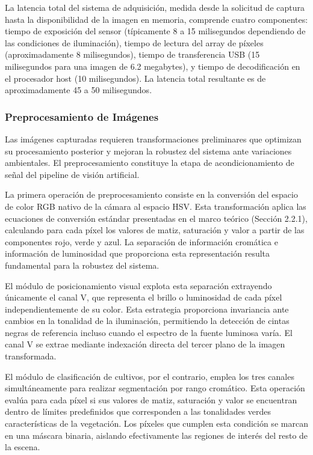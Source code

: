 La latencia total del sistema de adquisición, medida desde la solicitud de captura hasta la disponibilidad de la imagen en memoria, comprende cuatro componentes: tiempo de exposición del sensor (típicamente 8 a 15 milisegundos dependiendo de las condiciones de iluminación), tiempo de lectura del array de píxeles (aproximadamente 8 milisegundos), tiempo de transferencia USB (15 milisegundos para una imagen de 6.2 megabytes), y tiempo de decodificación en el procesador host (10 milisegundos). La latencia total resultante es de aproximadamente 45 a 50 milisegundos.

\subsubsection{Preprocesamiento de Imágenes}

Las imágenes capturadas requieren transformaciones preliminares que optimizan su procesamiento posterior y mejoran la robustez del sistema ante variaciones ambientales. El preprocesamiento constituye la etapa de acondicionamiento de señal del pipeline de visión artificial.

La primera operación de preprocesamiento consiste en la conversión del espacio de color RGB nativo de la cámara al espacio HSV. Esta transformación aplica las ecuaciones de conversión estándar presentadas en el marco teórico (Sección 2.2.1), calculando para cada píxel los valores de matiz, saturación y valor a partir de las componentes rojo, verde y azul. La separación de información cromática e información de luminosidad que proporciona esta representación resulta fundamental para la robustez del sistema.

El módulo de posicionamiento visual explota esta separación extrayendo únicamente el canal V, que representa el brillo o luminosidad de cada píxel independientemente de su color. Esta estrategia proporciona invariancia ante cambios en la tonalidad de la iluminación, permitiendo la detección de cintas negras de referencia incluso cuando el espectro de la fuente luminosa varía. El canal V se extrae mediante indexación directa del tercer plano de la imagen transformada.

El módulo de clasificación de cultivos, por el contrario, emplea los tres canales simultáneamente para realizar segmentación por rango cromático. Esta operación evalúa para cada píxel si sus valores de matiz, saturación y valor se encuentran dentro de límites predefinidos que corresponden a las tonalidades verdes características de la vegetación. Los píxeles que cumplen esta condición se marcan en una máscara binaria, aislando efectivamente las regiones de interés del resto de la escena.

